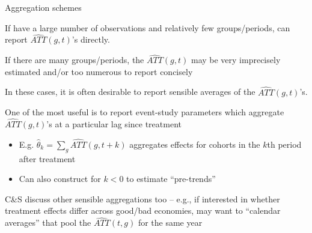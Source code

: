 \documentclass[usenames, dvipsnames, aspectratio = 169, 13pt]{beamer}
\newenvironment{wideitemize}{\itemize\addtolength{\itemsep}{10pt}}{\enditemize}
\begin{document}
\begin{frame}{Aggregation schemes}
\begin{wideitemize}
        \item
    If have a large number of observations and relatively few groups/periods, can report $\widehat{ATT}(g,t)$'s directly.
    
    \item
    If there are many groups/periods, the $\widehat{ATT}(g,t)$ may be very imprecisely estimated and/or too numerous to report concisely
    
    \pause
    \item
    In these cases, it is often desirable to report sensible averages of the $\widehat{ATT}(g,t)$'s. 
    
    \pause
    \item
    One of the most useful is to report event-study parameters which aggregate $\widehat{ATT}(g,t)$'s at a particular lag since treatment
        \begin{itemize}
            \item 
            E.g. $\hat{\theta}_k = \sum_g \widehat{ATT}(g, t+k)$ aggregates effects for cohorts in the $k$th period after treatment
            
            \item
            Can also construct for $k<0$ to estimate ``pre-trends''
        \end{itemize}
        
    \pause
    \item
    C\&S discuss other sensible aggregations too -- e.g., if interested in whether treatment effects differ across good/bad economies, may want to ``calendar averages'' that pool the $\widehat{ATT}(t,g)$ for the same year
\end{wideitemize}
    
\end{frame}
\end{document}

